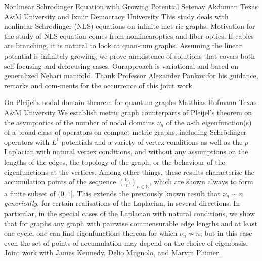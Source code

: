 \begin{addmargin}[2em]{0em}
\vspace{1.5ex}
\abs
{Nonlinear Schrodinger Equation with Growing Potential}
{Setenay Akduman}
{Texas A\&M University and Izmir Democracy University}
{This study deals with nonlinear Schrodinger (NLS) equations on infinite met-ric graphs.  Motivation for the study of NLS equation comes from nonlinearoptics and fiber optics.  If cables are branching, it is natural to look at quan-tum graphs.  Assuming the linear potential is infinitely growing, we prove anexistence of solutions that covers both self-focusing and defocusing cases.  Ourapproach is variational and based on generalized Nehari manifold. Thank Professor Alexander Pankov for his guidance, remarks and com-ments for the occurrence of this joint work.}


\vspace{1.5ex}
\abs
{On Pleijel's nodal domain theorem for quantum graphs}
{Matthias Hofmann}
{Texas A\&M University}
{We establish metric graph counterparts of Pleijel's theorem on the asymptotics of the number of nodal domains $\nu_n$ of the $n$-th eigenfunction(s) of a broad class of operators on compact metric graphs, including Schr\"{o}dinger operators with $L^1$-potentials and a variety of vertex conditions as well as the $p$-Laplacian with natural vertex conditions, and without any assumptions on the lengths of the edges, the topology of the graph, or the behaviour of the eigenfunctions at the vertices. Among other things, these results characterise the accumulation points of the sequence $(\frac{\nu_n}{n})_{n\in\mathbb{N}}$, which are shown always to form a finite subset of $(0,1]$. This extends the previously known result that $\nu_n\sim n$ \textit{generically}, for certain realisations of the Laplacian, in several directions. In particular, in the special cases of the Laplacian with natural conditions, we show that for graphs any graph with pairwise commensurable edge lengths and at least one cycle, one can find eigenfunctions thereon for which ${\nu_n} \not\sim n$; but in this case even the set of points of accumulation may depend on the choice of eigenbasis.\\
Joint work with James Kennedy, Delio Mugnolo, and Marvin Plümer.}




\end{addmargin}
